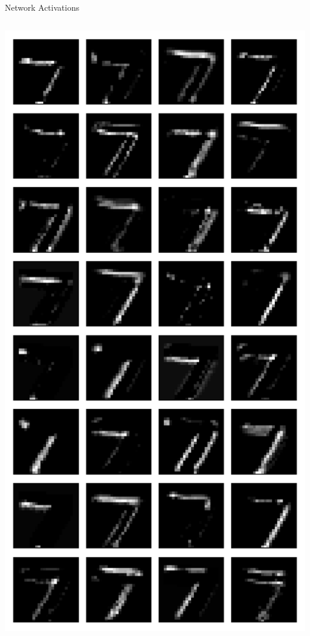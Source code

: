 \documentclass[10pt, aspectratio=169]{beamer} %
\begin{document}
\begin{frame}[fragile]{Network Activations}
\begin{columns}
\includegraphics[width=\textwidth]{keras_l1_outputs.pdf}

\end{columns}
\end{frame}
\end{document}
